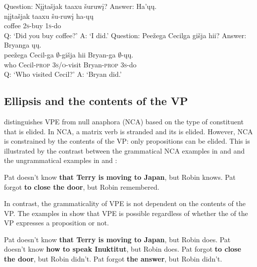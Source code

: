 \documentclass[output=paper]{LSP/langsci}
\begin{document}
 
\ea\label{ex:johnson:28}
\ea\label{ex:johnson:28a} 
\glll \textup{Question:} {Nįįtašjak taaxu} šuruwį? \textup{Answer:} Ha'ųų.\\
{} {nįįtašjak taaxu} šu-ruwį {} ha-ųų\\
{} coffee \textsc{2s}-buy {} \textsc{1s}-do\\
 \trans Q: `Did you buy coffee?' A: `I did.' 
\ex\label{ex:johnson:28b} 
\glll \textup{Question:} Peežega Cecilga {gišja hii}? \textup{Answer:} Bryanga ųų.\\
{} peežega Cecil-ga $\emptyset$-{gišja hii} {} Bryan-ga {\db}$\emptyset$-ųų.\\
{} who Cecil-\textsc{prop} \textsc{3s/o}-visit {} Bryan-\textsc{prop} {\db}\textsc{3s}-do\\
\trans Q: `Who visited Cecil?' A: `Bryan did.'
\z
\z


\subsection{Ellipsis and the contents of the VP}\label{sec:johnson:3.2}

\citet{Goldberg2005} distinguishes VPE from null  anaphora (NCA) based on the type of constituent that is elided. In NCA, a matrix verb is stranded and its  is elided. However, NCA is constrained by the contents of the VP: only propositions can be elided. This is illustrated by the contrast between the grammatical NCA examples in  and  and the ungrammatical examples in  and :
 
\ea\label{ex:johnson:29}
\ea\label{ex:johnson:29a} 
Pat doesn't know \textbf{that Terry is moving to Japan}, but Robin knows.
\label{ex:johnson:29b}
\ex\label{ex:johnson:29c}
Pat forgot \textbf{to close the door}, but Robin remembered.
\label{ex:johnson:29d}
\z
\z

In contrast, the grammaticality of VPE is not dependent on the contents of the VP. The examples in  show that VPE is possible regardless of whether the  of the VP expresses a proposition or not.
 
\ea\label{ex:johnson:30}
\ea 
Pat doesn't know \textbf{that Terry is moving to Japan}, but Robin does.
\ex 
Pat doesn't know \textbf{how to speak Inuktitut}, but Robin does.
\ex 
Pat forgot \textbf{to close the door}, but Robin didn't.
\ex 
Pat forgot \textbf{the answer}, but Robin didn't.
\z
\z
\end{document}
